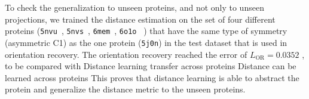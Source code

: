 
To check the generalization to unseen proteins, and not only to  unseen projections, we trained the distance estimation on the set of four different proteins (\texttt{5nvu}~\cite{5nvu_pdb}, \texttt{5nvs}~\cite{5nvs_pdb}, \texttt{6mem}~\cite{6mem_pdb}, \texttt{6o1o}~\cite{6o1o_pdb} ) that have the same type of symmetry (asymmetric  C1) as the one protein (\texttt{5j0n}) in the test dataset that is used in orientation recovery.
The orientation recovery reached the error of $L_\text{OR} = 0.0352$ ,
to be compared with
Distance learning transfer across proteins Distance can be learned across proteins
This proves that distance learning is able to abstract the protein and generalize the distance metric to the unseen proteins.
